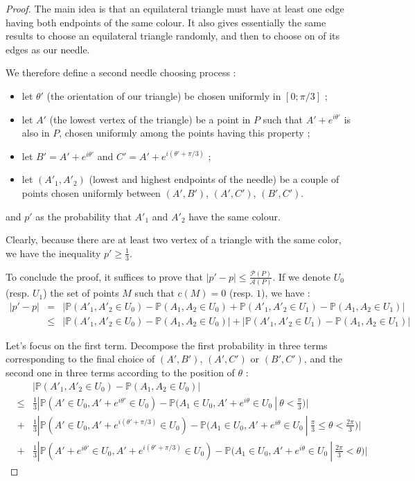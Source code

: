 \documentclass[a4paper,11pt]{article}
\begin{document}
\begin{proof}
The main idea is that an equilateral triangle must have at least one edge having both endpoints of the same colour.
It also gives essentially the same results to choose an equilateral triangle randomly, and then to choose on of its edges as our needle.

We therefore define a second needle choosing process :
\begin{itemize}
  \item let $\theta '$ (the orientation of our triangle) be chosen uniformly in $[0;\pi / 3]$ ;
  \item let $A'$ (the lowest vertex of the triangle) be a point in $P$ such that $A' + e^{i\theta '}$ is also in $P$, chosen uniformly among the points having this property ;
  \item let $B' = A' + e^{i \theta '}$ and $C' = A' + e^{i (\theta ' + \pi / 3 ) }$ ;
  \item let $(A'_1,A'_2)$ (lowest and highest endpoints of the needle) be a couple of points chosen uniformly between $(A',B')$, $(A',C')$, $(B',C')$.
\end{itemize}
and $p'$ as the probability that $A'_1$ and $A'_2$ have the same colour.

Clearly, because there are at least two vertex of a triangle with the same color, we have the inequality $p' \geq \frac{1}{3} $.

To conclude the proof, it suffices to prove that $|p' - p| \leq \frac{\mathcal{P}(P)}{\mathcal{A}(P)}$.
If we denote $U_0$ (resp. $U_1$) the set of points $M$ such that $c(M) = 0$ (resp. $1$), we have :
\begin{eqnarray*}
|p' - p| 
  &=& | \mathbb{P}(A'_1 , A'_2 \in U_0) - \mathbb{P}(A_1 , A_2 \in U_0) + \mathbb{P}(A'_1 , A'_2 \in U_1) - \mathbb{P}(A_1 , A_2 \in U_1) | \\
  &\leq& | \mathbb{P}(A'_1 , A'_2 \in U_0) - \mathbb{P}(A_1 , A_2 \in U_0) | + | \mathbb{P}(A'_1 , A'_2 \in U_1) - \mathbb{P}(A_1 , A_2 \in U_1) |
\end{eqnarray*}

Let's focus on the first term. 
Decompose the first probability in three terms corresponding to the final choice of $(A',B')$, $(A',C')$ or $(B',C')$, and the second one in three terms according to the position of $\theta$ :
\begin{eqnarray*}
& & | \mathbb{P}(A'_1 , A'_2 \in U_0) - \mathbb{P}(A_1 , A_2 \in U_0) | \\
&\leq& \frac{1}{3} | \mathbb{P}(A' \in U_0 , A' + e^{i \theta '} \in U_0) - \mathbb{P}(A_1 \in U_0 , A' + e^{i \theta} \in U_0 \ |\  \theta < \frac{\pi}{3} ) | \\
&+& \frac{1}{3} | \mathbb{P}(A' \in U_0 , A' + e^{i(\theta ' + \pi / 3 ) } \in U_0) - \mathbb{P}(A_1 \in U_0 , A' + e^{i \theta} \in U_0 \ |\  \frac{\pi}{3} \leq \theta < \frac{2 \pi}{3} ) | \\
&+& \frac{1}{3} | \mathbb{P}(A' + e^{i \theta '} \in U_0 , A' + e^{i(\theta ' + \pi / 3 ) } \in U_0) - \mathbb{P}(A_1 \in U_0 , A' + e^{i \theta} \in U_0 \ | \  \frac{2 \pi}{3} < \theta ) |
\end{eqnarray*}

\end{proof}
\end{document}
